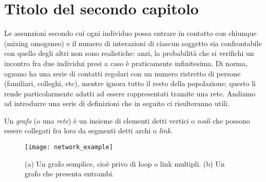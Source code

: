 \chapter{Titolo del secondo capitolo}
\label{chap:cap2}

Le assunzioni secondo cui ogni individuo possa entrare in contatto con chiunque (mixing omogeneo) e il numero di interazioni di ciascun soggetto sia confrontabile con quello degli altri non sono realistiche: anzi, la probabilità che si verifichi un incontro fra due individui presi a caso è praticamente infinitesima. Di norma, ognuno ha una serie di contatti regolari con un numero ristretto di persone (familiari, colleghi, etc), mentre ignora tutto il resto della popolazione; questo li rende particolarmente adatti ad essere rappresentati tramite una rete.
\medskip 
Andiamo ad introdurre una serie di definizioni che in seguito ci risulteranno utili. \\
\begin{definizione}
Un \emph{grafo} (o una \emph{rete}) è un insieme di elementi detti vertici o \emph{nodi} che possono essere collegati fra loro da segmenti detti archi o \emph{link}.
\end{definizione}
\begin{figure}
		\begin{center}
			\texttt{[image: network\_example]}
			\caption{(a) Un grafo semplice, cioè privo di loop o link multipli. (b) Un grafo che presenta entrambi. \cite{Newman}}
			\label{fig:net_ex}
		\end{center}
	\end{figure}
	
